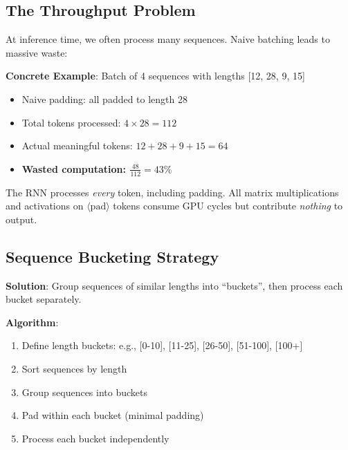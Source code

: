 \documentclass{article}
\begin{document}
\subsection{The Throughput Problem}

At inference time, we often process many sequences. Naive batching leads to massive waste:

\textbf{Concrete Example}: Batch of 4 sequences with lengths [12, 28, 9, 15]

\begin{itemize}
\item Naive padding: all padded to length 28
\item Total tokens processed: $4 \times 28 = 112$
\item Actual meaningful tokens: $12 + 28 + 9 + 15 = 64$
\item \textbf{Wasted computation: $\frac{48}{112} = 43\%$}
\end{itemize}

\begin{center}
\end{center}

The RNN processes \textit{every} token, including padding. All matrix multiplications and activations on $\langle \text{pad} \rangle$ tokens consume GPU cycles but contribute \textit{nothing} to output.

\subsection{Sequence Bucketing Strategy}

\textbf{Solution}: Group sequences of similar lengths into ``buckets'', then process each bucket separately.

\textbf{Algorithm}:
\begin{enumerate}
\item Define length buckets: e.g., [0-10], [11-25], [26-50], [51-100], [100+]
\item Sort sequences by length
\item Group sequences into buckets
\item Pad within each bucket (minimal padding)
\item Process each bucket independently
\end{enumerate}
\end{document}
